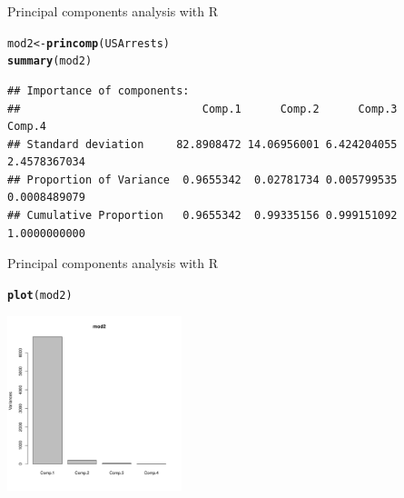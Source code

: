 \documentclass[10pt,xcolor=dvipsnames]{beamer}\usepackage[]{graphicx}\usepackage[]{color}
\makeatletter
\newcommand{\hlstd}[1]{\textcolor[rgb]{0.345,0.345,0.345}{#1}}%
\newcommand{\hlkwb}[1]{\textcolor[rgb]{0.69,0.353,0.396}{#1}}%
\newcommand{\hlkwd}[1]{\textcolor[rgb]{0.737,0.353,0.396}{\textbf{#1}}}%
\newenvironment{kframe}{%
 \def\at@end@of@kframe{}%
 \ifinner\ifhmode%
  \def\at@end@of@kframe{\end{minipage}}%
  \begin{minipage}{\columnwidth}%
 \fi\fi%
 \def\FrameCommand##1{\hskip\@totalleftmargin \hskip-\fboxsep
 \colorbox{shadecolor}{##1}\hskip-\fboxsep
     \hskip-\linewidth \hskip-\@totalleftmargin \hskip\columnwidth}%
 \MakeFramed {\advance\hsize-\width
   \@totalleftmargin\z@ \linewidth\hsize
   \@setminipage}}%
 {\par\unskip\endMakeFramed%
 \at@end@of@kframe}
\newenvironment{knitrout}{}{} %
\makeatother
\begin{document}
\begin{frame}{Principal components analysis with R}

\begin{knitrout}\footnotesize
{}\color{fgcolor}\begin{kframe}
\begin{alltt}
\hlstd{mod2} \hlkwb{<-} \hlkwd{princomp}\hlstd{(USArrests)}
\hlkwd{summary}\hlstd{(mod2)}
\end{alltt}
\begin{verbatim}
## Importance of components:
##                            Comp.1      Comp.2      Comp.3       Comp.4
## Standard deviation     82.8908472 14.06956001 6.424204055 2.4578367034
## Proportion of Variance  0.9655342  0.02781734 0.005799535 0.0008489079
## Cumulative Proportion   0.9655342  0.99335156 0.999151092 1.0000000000
\end{verbatim}
\end{kframe}
\end{knitrout}
\end{frame}

\begin{frame}{Principal components analysis with R}
\begin{knitrout}\footnotesize
{}\color{fgcolor}\begin{kframe}
\begin{alltt}
\hlkwd{plot}\hlstd{(mod2)}
\end{alltt}
\end{kframe}

{\centering \includegraphics[width=2in]{figure/plotPCA-1} 

}



\end{knitrout}
\end{frame}
\end{document}
